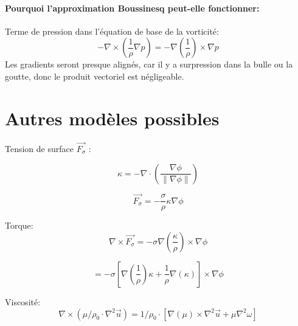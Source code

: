 \documentclass[10pt,a4paper]{article}
\begin{document}
\paragraph{Pourquoi l'approximation Boussinesq peut-elle fonctionner:}
Terme de pression dans l'équation de base de la vorticité:
\[ -\nabla \times \left( \frac{1}{\rho} \nabla p \right) = -\nabla \left( \frac{1}{\rho} \right) \times \nabla p \] 
Les gradients seront presque alignés, car il y a surpression dans la bulle ou la goutte, donc le produit vectoriel est négligeable.

\section{Autres modèles possibles}


Tension de surface $\vec{F_{\sigma}}$ :

\[ \kappa = - \nabla \cdot \left( \frac{\nabla\phi}{\left\| \nabla \phi \right\|} \right) \] 

\[ \vec{F_{\sigma}}= - \frac{\sigma}{\rho} \kappa \nabla \phi \]

Torque:
\[ \nabla \times \vec{F_{\sigma}} = - \sigma\nabla\left( \frac{\kappa}{\rho}\right)\times \nabla \phi \]

\[ =-\sigma \left[ \nabla\left( \frac{1}{\rho}\right)\kappa + \frac{1}{\rho} \nabla(\kappa) \right]\times \nabla\phi \]

Viscosité:
\[
\nabla\times (\mu/\rho_0\cdot\nabla^2\vec{u}) = 1/\rho_0 \cdot \left[ \nabla(\mu) \times \nabla^2\vec{u} + \mu \nabla^2\omega \right]
\]
\end{document}
